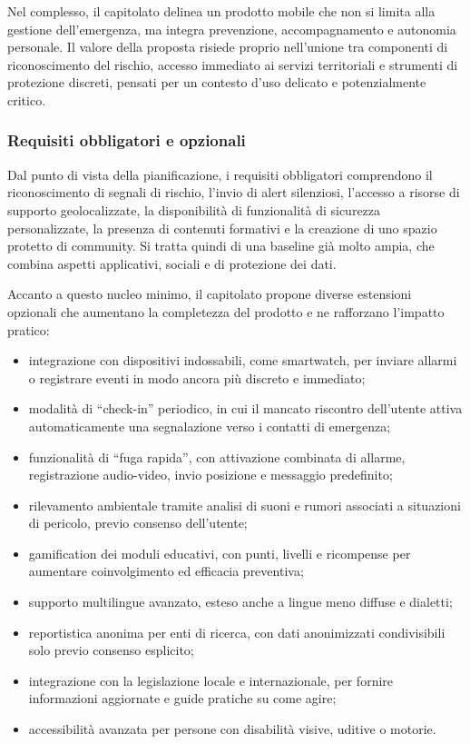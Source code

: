 \documentclass[a4paper,12pt]{article}
\begin{document}
Nel complesso, il capitolato delinea un prodotto mobile che non si limita alla gestione dell'emergenza, ma integra prevenzione, accompagnamento e autonomia personale. Il valore della proposta risiede proprio nell'unione tra componenti di riconoscimento del rischio, accesso immediato ai servizi territoriali e strumenti di protezione discreti, pensati per un contesto d'uso delicato e potenzialmente critico.

\subsubsection{Requisiti obbligatori e opzionali}

Dal punto di vista della pianificazione, i requisiti obbligatori comprendono il riconoscimento di segnali di rischio, l'invio di alert silenziosi, l'accesso a risorse di supporto geolocalizzate, la disponibilità di funzionalità di sicurezza personalizzate, la presenza di contenuti formativi e la creazione di uno spazio protetto di community. Si tratta quindi di una baseline già molto ampia, che combina aspetti applicativi, sociali e di protezione dei dati.

Accanto a questo nucleo minimo, il capitolato propone diverse estensioni opzionali che aumentano la completezza del prodotto e ne rafforzano l'impatto pratico:
\begin{itemize}
    \item integrazione con dispositivi indossabili, come smartwatch, per inviare allarmi o registrare eventi in modo ancora più discreto e immediato;
    \item modalità di ``check-in'' periodico, in cui il mancato riscontro dell'utente attiva automaticamente una segnalazione verso i contatti di emergenza;
    \item funzionalità di ``fuga rapida'', con attivazione combinata di allarme, registrazione audio-video, invio posizione e messaggio predefinito;
    \item rilevamento ambientale tramite analisi di suoni e rumori associati a situazioni di pericolo, previo consenso dell'utente;
    \item gamification dei moduli educativi, con punti, livelli e ricompense per aumentare coinvolgimento ed efficacia preventiva;
    \item supporto multilingue avanzato, esteso anche a lingue meno diffuse e dialetti;
    \item reportistica anonima per enti di ricerca, con dati anonimizzati condivisibili solo previo consenso esplicito;
    \item integrazione con la legislazione locale e internazionale, per fornire informazioni aggiornate e guide pratiche su come agire;
    \item accessibilità avanzata per persone con disabilità visive, uditive o motorie.
\end{itemize}
\end{document}
